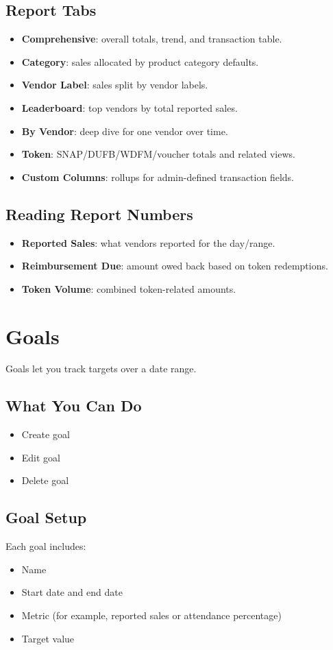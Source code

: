 \documentclass[11pt]{article}
\begin{document}
\subsection{Report Tabs}
\begin{itemize}
  \item \textbf{Comprehensive}: overall totals, trend, and transaction table.
  \item \textbf{Category}: sales allocated by product category defaults.
  \item \textbf{Vendor Label}: sales split by vendor labels.
  \item \textbf{Leaderboard}: top vendors by total reported sales.
  \item \textbf{By Vendor}: deep dive for one vendor over time.
  \item \textbf{Token}: SNAP/DUFB/WDFM/voucher totals and related views.
  \item \textbf{Custom Columns}: rollups for admin-defined transaction fields.
\end{itemize}

\subsection{Reading Report Numbers}
\begin{itemize}
  \item \textbf{Reported Sales}: what vendors reported for the day/range.
  \item \textbf{Reimbursement Due}: amount owed back based on token redemptions.
  \item \textbf{Token Volume}: combined token-related amounts.
\end{itemize}

\section{Goals}
Goals let you track targets over a date range.

\subsection{What You Can Do}
\begin{itemize}
  \item Create goal
  \item Edit goal
  \item Delete goal
\end{itemize}

\subsection{Goal Setup}
Each goal includes:
\begin{itemize}
  \item Name
  \item Start date and end date
  \item Metric (for example, reported sales or attendance percentage)
  \item Target value
\end{itemize}
\end{document}
